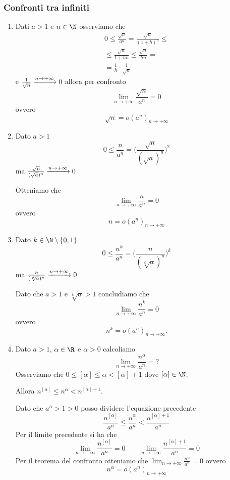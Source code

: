 \subsubsection{Confronti tra infiniti}
\begin{enumerate}
    \item Dati $ a>1 $ e $ n \in \N $ osserviamo che 
    \begin{multline*}
        0\le \frac{\sqrt{n}}{a^n}=\frac{\sqrt{n}}{(1+h)^n}\le\\
        \le \frac{\sqrt{n}}{1+hn}\le \frac{\sqrt{n}}{hn}=\\
        =\frac{1}{h}\cdot\frac{1}{\sqrt{n}}
    \end{multline*}
    e $ \frac{1}{\sqrt{n}} \xrightarrow{n\to + \infty} 0 \displaystyle $ allora per confronto \[
        \lim_{n\to +\infty} \frac{\sqrt{n}}{a^n} =0
    \]
    ovvero \begin{equation}
        \sqrt{n}=o(a^n)_{n\to +\infty}
    \end{equation}
    \item Dato $ a>1 $
    \[
        0\le \frac{n}{a^n}=\bigg(\frac{\sqrt{n}}{(\sqrt{a})^n}\bigg)^2
    \]
    ma $ \frac{\sqrt{n}}{(\sqrt{a})^n} \xrightarrow{n\to + \infty} 0 \displaystyle $

    Otteniamo che \[
        \lim_{n\to + \infty} \frac{n}{a^n} =0
    \]
    ovvero \begin{equation}
        n=o(a^n)_{n\to + \infty}
    \end{equation}
    \item Dato $ k \in \N\setminus \{0,1\} $
    \[
        0\le \frac{n^k}{a^n}=\bigg(\frac{n}{(\sqrt[k]{a})^n}\bigg)^k
    \]
    ma $ \frac{n}{(\sqrt[k]{a})^n} \xrightarrow{n\to + \infty} 0 \displaystyle $

    Dato che $ a>1 $ e $ \sqrt[k]{a}>1 $ concludiamo che \[
        \lim_{n\to + \infty} \frac{n^k}{a^n} = 0 
    \]
    ovvero \begin{equation}
        n^k = o(a^n)_{n\to + \infty}.
    \end{equation}
    \item Dato $ a>1 $, $ \alpha \in \R $ e $ \alpha>0 $ calcoliamo \[
        \lim_{n\to + \infty} \frac{n^{\alpha}}{a^{n}} =?
    \]
    Osserviamo che $ 0\le [\alpha]\le \alpha < [\alpha]+1 $ dove $ [\alpha] \in \N $.

    Allora $ n^{[\alpha]}\le n^{\alpha}< n^{[\alpha]+1} $.

    Dato che $ a^{n}>1>0 $ posso dividere l'equazione precedente \[
        \frac{n^{[\alpha]}}{a^{n}}\le \frac{n^{\alpha}}{a^{n}}<\frac{n^{[\alpha]+1}}{a^{n}}
    \] Per il limite precedente si ha che \[
        \lim_{n\to + \infty} \frac{n^{[\alpha]}}{a^{n}} = 0\qquad \lim_{n\to + \infty} \frac{n^{[\alpha]+1}}{a^{n}} = 0
    \]
    Per il teorema del confronto otteniamo che $ \displaystyle \lim_{n\to + \infty} \frac{n^{\alpha}}{a^{n}} = 0 $ ovvero \begin{equation}
        n^{\alpha}=o(a^{n})_{n\to +\infty}
    \end{equation}
\end{enumerate}